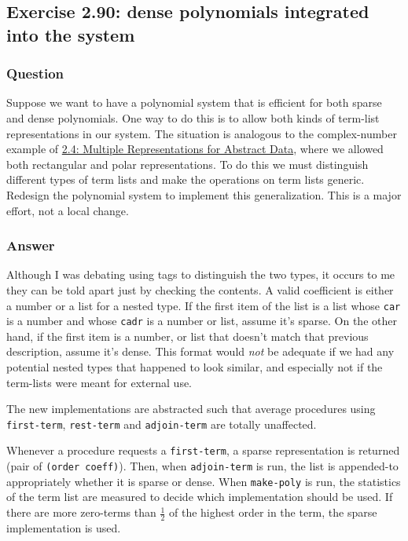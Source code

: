 \documentclass[final,fleqn,titlepage,twoside]{article}
\begin{document}
\subsection{Exercise 2.90: dense polynomials integrated into the system}
\label{sec:orgaa0bbc1}
\subsubsection{Question}
\label{sec:orgfd18d52}
Suppose we want to have a polynomial system that is efficient for both sparse
and dense polynomials. One way to do this is to allow both kinds of term-list
representations in our system. The situation is analogous to the complex-number
example of \hyperref[sec:org22950c1]{2.4: Multiple Representations for Abstract Data}, where we allowed
both rectangular and polar representations. To do this we must distinguish
different types of term lists and make the operations on term lists generic.
Redesign the polynomial system to implement this generalization. This is a major
effort, not a local change.

\subsubsection{Answer}
\label{sec:orgc58cd0e}
Although I was debating using tags to distinguish the two types, it occurs to me
they can be told apart just by checking the contents. A valid coefficient is
either a number or a list for a nested type. If the first item of the list is a
list whose \texttt{car} is a number and whose \texttt{cadr} is a number or list, assume it's
sparse. On the other hand, if the first item is a number, or list that doesn't
match that previous description, assume it's dense. This format would \emph{not} be
adequate if we had any potential nested types that happened to look similar, and
especially not if the term-lists were meant for external use.

The new implementations are abstracted such that average procedures using
\texttt{first-term}, \texttt{rest-term} and \texttt{adjoin-term} are
totally unaffected.

Whenever a procedure requests a \texttt{first-term}, a sparse representation is
returned (pair of \texttt{(order coeff)}). Then, when \texttt{adjoin-term} is run,
the list is appended-to appropriately whether it is sparse or dense. When
\texttt{make-poly} is run, the statistics of the term list are measured to
decide which implementation should be used. If there are more zero-terms than
\(\frac{1}{2}\) of the highest order in the term, the sparse implementation is
used.
\end{document}
